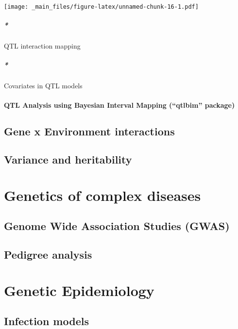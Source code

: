 \documentclass[12pt,]{book}
\let\oldparagraph\paragraph
\renewcommand{\paragraph}[1]{\oldparagraph{#1}\mbox{}}
\begin{document}
\texttt{[image: \_main\_files/figure-latex/unnamed-chunk-16-1.pdf]}

\paragraph*{QTL interaction mapping}\label{qtl-interaction-mapping}

\paragraph*{Covariates in QTL models}\label{covariates-in-qtl-models}

\subsubsection{\texorpdfstring{QTL Analysis using Bayesian Interval
Mapping (``qtlbim''
package)}{QTL Analysis using Bayesian Interval Mapping (qtlbim package)}}\label{qtl-analysis-using-bayesian-interval-mapping-qtlbim-package}

\section{Gene x Environment
interactions}\label{gene-x-environment-interactions}

\section{Variance and heritability}\label{variance-and-heritability}

\chapter{Genetics of complex
diseases}\label{genetics-of-complex-diseases}

\section{Genome Wide Association Studies
(GWAS)}\label{genome-wide-association-studies-gwas}

\section{Pedigree analysis}\label{pedigree-analysis}

\chapter{Genetic Epidemiology}\label{genetic-epidemiology}

\section{Infection models}\label{infection-models}


\end{document}
